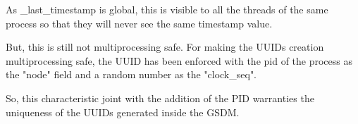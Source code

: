 As \_last\_timestamp is global, this is visible to all the threads of the same process so that they will never see the same timestamp value.

But, this is still not multiprocessing safe. For making the UUIDs creation multiprocessing safe, the UUID has been enforced with the \acrshort{pid} of the process as the "node" field and a random number as the "clock\_seq".

So, this characteristic joint with the addition of the PID warranties the uniqueness of the UUIDs generated inside the GSDM.